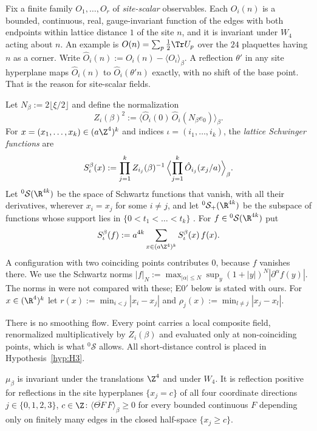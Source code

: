 Fix a finite family $O_1,\dots,O_r$ of \emph{site-scalar} observables. Each $O_i(n)$ is a bounded, continuous, real, gauge-invariant function of the edges with both endpoints within lattice distance $1$ of the site $n$, and it is invariant under $W_4$ acting about $n$. An example is $O(n)=\sum_p\tfrac12\Tr U_p$ over the $24$ plaquettes having $n$ as a corner. Write $\hat O_i(n):=O_i(n)-\langle O_i\rangle_\beta$. A reflection $\theta'$ in any site hyperplane maps $\hat O_i(n)$ to $\hat O_i(\theta'n)$ exactly, with no shift of the base point. That is the reason for site-scalar fields.

Let $N_\beta:=2\lfloor\xi/2\rfloor$ and define the normalization
\[
  Z_i(\beta)^2:=\langle\hat O_i(0)\,\hat O_i(N_\beta e_0)\rangle_\beta .
\]
For $x=(x_1,\dots,x_k)\in(a\Z^4)^k$ and indices $\iota=(i_1,\dots,i_k)$, the \emph{lattice Schwinger functions} are
\begin{equation}\label{red:Sbeta}
  S^\beta_\iota(x):=\prod_{j=1}^k Z_{i_j}(\beta)^{-1}\,\Bigl\langle\prod_{j=1}^k\hat O_{i_j}(x_j/a)\Bigr\rangle_\beta .
\end{equation}
Let ${}^0\mathcal S(\R^{4k})$ be the space of Schwartz functions that vanish, with all their derivatives, wherever $x_i=x_j$ for some $i\ne j$, and let ${}^0\mathcal S_+(\R^{4k})$ be the subspace of functions whose support lies in $\{0<t_1<\dots<t_k\}$ \cite[eq.~(2.25)]{KQR21}. For $f\in{}^0\mathcal S(\R^{4k})$ put
\[
  S^\beta_\iota(f):=a^{4k}\sum_{x\in(a\Z^4)^k}S^\beta_\iota(x)\,f(x).
\]
A configuration with two coinciding points contributes $0$, because $f$ vanishes there. We use the Schwartz norms $|f|_N:=\max_{|\alpha|\le N}\sup_y(1+|y|)^N|\partial^\alpha f(y)|$. The norms in \cite[eq.~(9.18)]{KQR21} were not compared with these; E0$'$ below is stated with ours. For $x\in(\R^4)^k$ let $r(x):=\min_{i<j}|x_i-x_j|$ and $\rho_j(x):=\min_{l\ne j}|x_j-x_l|$.

There is no smoothing flow. Every point carries a local composite field, renormalized multiplicatively by $Z_i(\beta)$ and evaluated only at non-coinciding points, which is what ${}^0\mathcal S$ allows. All short-distance control is placed in Hypothesis~\ref{hyp:H3}.

\begin{hypothesis}\label{hyp:H0}
$\mu_\beta$ is invariant under the translations $\Z^4$ and under $W_4$. It is reflection positive for reflections in the site hyperplanes $\{x_j=c\}$ of all four coordinate directions $j\in\{0,1,2,3\}$, $c\in\Z$: $\langle\overline{\Theta F}\,F\rangle_\beta\ge0$ for every bounded continuous $F$ depending only on finitely many edges in the closed half-space $\{x_j\ge c\}$.
\end{hypothesis}

